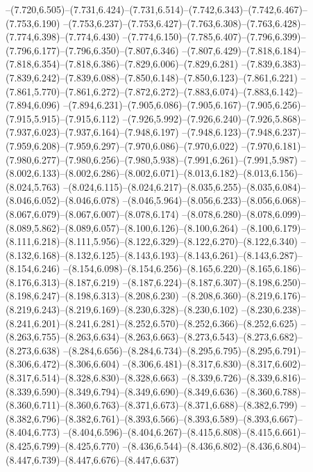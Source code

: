   --(7.720,6.505)--(7.731,6.424)--(7.731,6.514)--(7.742,6.343)--(7.742,6.467)--(7.753,6.190)%
  --(7.753,6.237)--(7.753,6.427)--(7.763,6.308)--(7.763,6.428)--(7.774,6.398)--(7.774,6.430)%
  --(7.774,6.150)--(7.785,6.407)--(7.796,6.399)--(7.796,6.177)--(7.796,6.350)--(7.807,6.346)%
  --(7.807,6.429)--(7.818,6.184)--(7.818,6.354)--(7.818,6.386)--(7.829,6.006)--(7.829,6.281)%
  --(7.839,6.383)--(7.839,6.242)--(7.839,6.088)--(7.850,6.148)--(7.850,6.123)--(7.861,6.221)%
  --(7.861,5.770)--(7.861,6.272)--(7.872,6.272)--(7.883,6.074)--(7.883,6.142)--(7.894,6.096)%
  --(7.894,6.231)--(7.905,6.086)--(7.905,6.167)--(7.905,6.256)--(7.915,5.915)--(7.915,6.112)%
  --(7.926,5.992)--(7.926,6.240)--(7.926,5.868)--(7.937,6.023)--(7.937,6.164)--(7.948,6.197)%
  --(7.948,6.123)--(7.948,6.237)--(7.959,6.208)--(7.959,6.297)--(7.970,6.086)--(7.970,6.022)%
  --(7.970,6.181)--(7.980,6.277)--(7.980,6.256)--(7.980,5.938)--(7.991,6.261)--(7.991,5.987)%
  --(8.002,6.133)--(8.002,6.286)--(8.002,6.071)--(8.013,6.182)--(8.013,6.156)--(8.024,5.763)%
  --(8.024,6.115)--(8.024,6.217)--(8.035,6.255)--(8.035,6.084)--(8.046,6.052)--(8.046,6.078)%
  --(8.046,5.964)--(8.056,6.233)--(8.056,6.068)--(8.067,6.079)--(8.067,6.007)--(8.078,6.174)%
  --(8.078,6.280)--(8.078,6.099)--(8.089,5.862)--(8.089,6.057)--(8.100,6.126)--(8.100,6.264)%
  --(8.100,6.179)--(8.111,6.218)--(8.111,5.956)--(8.122,6.329)--(8.122,6.270)--(8.122,6.340)%
  --(8.132,6.168)--(8.132,6.125)--(8.143,6.193)--(8.143,6.261)--(8.143,6.287)--(8.154,6.246)%
  --(8.154,6.098)--(8.154,6.256)--(8.165,6.220)--(8.165,6.186)--(8.176,6.313)--(8.187,6.219)%
  --(8.187,6.224)--(8.187,6.307)--(8.198,6.250)--(8.198,6.247)--(8.198,6.313)--(8.208,6.230)%
  --(8.208,6.360)--(8.219,6.176)--(8.219,6.243)--(8.219,6.169)--(8.230,6.328)--(8.230,6.102)%
  --(8.230,6.238)--(8.241,6.201)--(8.241,6.281)--(8.252,6.570)--(8.252,6.366)--(8.252,6.625)%
  --(8.263,6.755)--(8.263,6.634)--(8.263,6.663)--(8.273,6.543)--(8.273,6.682)--(8.273,6.638)%
  --(8.284,6.656)--(8.284,6.734)--(8.295,6.795)--(8.295,6.791)--(8.306,6.472)--(8.306,6.604)%
  --(8.306,6.481)--(8.317,6.830)--(8.317,6.602)--(8.317,6.514)--(8.328,6.830)--(8.328,6.663)%
  --(8.339,6.726)--(8.339,6.816)--(8.339,6.590)--(8.349,6.794)--(8.349,6.690)--(8.349,6.636)%
  --(8.360,6.788)--(8.360,6.711)--(8.360,6.763)--(8.371,6.673)--(8.371,6.688)--(8.382,6.799)%
  --(8.382,6.796)--(8.382,6.761)--(8.393,6.566)--(8.393,6.589)--(8.393,6.667)--(8.404,6.773)%
  --(8.404,6.596)--(8.404,6.267)--(8.415,6.808)--(8.415,6.661)--(8.425,6.799)--(8.425,6.770)%
  --(8.436,6.544)--(8.436,6.802)--(8.436,6.804)--(8.447,6.739)--(8.447,6.676)--(8.447,6.637)%
